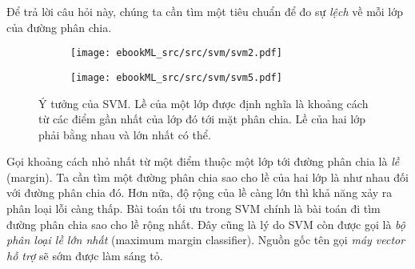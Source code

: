 Để trả lời câu hỏi này, chúng ta cần tìm một tiêu chuẩn để đo sự \textit{lệch} về mỗi lớp của đường phân chia. 
\begin{figure}[t]
    \begin{subfigure}{0.49\textwidth}
    \texttt{[image: ebookML\_src/src/svm/svm2.pdf]}
    \caption{}
    \end{subfigure}
    \begin{subfigure}{0.49\textwidth}
    \texttt{[image: ebookML\_src/src/svm/svm5.pdf]}
    \caption{}
    \end{subfigure}
    \caption{Ý tưởng của SVM. Lề của một lớp được
 định nghĩa là khoảng cách từ các điểm gần nhất của lớp đó tới mặt phân
    chia. Lề của hai lớp phải bằng nhau và lớn nhất có thể.}
    \label{fig:19_svm2}
\end{figure}
Gọi khoảng cách nhỏ nhất từ một điểm thuộc một lớp tới đường phân chia là \textit{lề} (margin). Ta cần tìm một đường phân chia sao cho lề của hai lớp là như nhau đối với đường phân chia đó. Hơn nữa, độ rộng của lề càng lớn thì khả năng xảy ra phân loại lỗi càng thấp. Bài toán tối ưu trong SVM chính là bài toán đi tìm đường phân chia
sao cho lề rộng nhất. Đây cũng là lý do SVM
còn được gọi là \textit{bộ phân loại lề lớn nhất} ({maximum margin classifier}). Nguồn gốc tên gọi
\textit{máy vector hỗ trợ} sẽ sớm được làm sáng tỏ.
 

 
 



